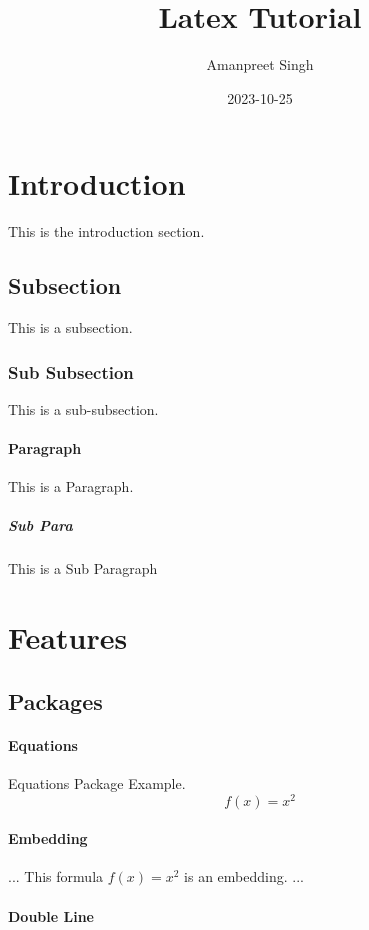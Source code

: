 \documentclass{article}
\title{Latex Tutorial}
\date{2023-10-25}
\author{Amanpreet Singh}
\begin{document}
  \maketitle %
  \newpage %

\section{Introduction}
This is the introduction section.

\subsection{Subsection}
This is a subsection.  

\subsubsection{Sub Subsection}
This is a sub-subsection.

\paragraph{Paragraph} 
This is a Paragraph.

\subparagraph{Sub Para}
This is a Sub Paragraph

\section{Features}

\subsection{Packages}

\paragraph{Equations}
Equations Package Example.
\begin{equation}
  f(x) = x^2
\end{equation}

\paragraph{Embedding}
...
This formula $f(x) = x^2$ is an embedding.
...

\paragraph*{Double Line}
\end{document}
